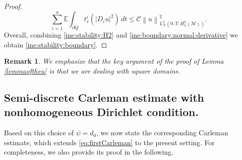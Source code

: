 \documentclass[11pt,oneside,leqno]{amsart}
\numberwithin{equation}{section}
\numberwithin{equation}{section}
\newcommand{\E}{\mathbb{E}}
\newtheorem{remark}[theorem]{Remark}
\begin{document}
\begin{proof}
\begin{equation}\label{ine:boundary:normal:derivative}
   \sum_{i=1}^{n}\E\int_{\partial Q}t_{r}^{i}(|D_{i}u|^{2})\,dt\leq 
   \mathcal{C} \left\| u\right\|^{2}_{L_{\mathcal{F}}^{2}(0,T;H_h^{2}(\mathcal{M}))}. 
\end{equation}
Overall, combining \eqref{ine:stability:H2} and \eqref{ine:boundary:normal:derivative} we obtain \eqref{ine:stability:boundary}.
\end{proof}
\begin{remark}
We emphasize that the key argument of the proof of Lemma \ref{lemmaoftheu}  is that we are dealing with square domains.
\end{remark}

\subsection{Semi-discrete Carleman estimate with nonhomogeneous Dirichlet condition.}
Based on this choice of $\psi=d_0$, we now state the corresponding Carleman estimate, which extends \eqref{eq:firstCarleman} to the present setting. 
For completeness, we also provide its proof in the following.
\end{document}
